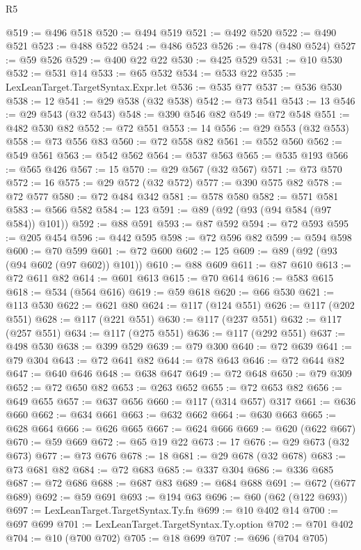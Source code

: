 \begin{lexlean}{R5}
\begin{coremodule}
@519 := @496 @518
@520 := @494 @519
@521 := @492 @520
@522 := @490 @521
@523 := @488 @522
@524 := @486 @523
@526 := @478 (@480 @524)
@527 := @59 @526
@529 := @400 @22 @22
@530 := @425 @529
@531 := @10 @530
@532 := @531 @14
@533 := @65 @532
@534 := @533 @22
@535 := LexLeanTarget.TargetSyntax.Expr.let
@536 := @535 @77
@537 := @536 @530
@538 := 12
@541 := @29 @538 (@32 @538)
@542 := @73 @541
@543 := 13
@546 := @29 @543 (@32 @543)
@548 := @390 @546 @82
@549 := @72 @548
@551 := @482 @530 @82
@552 := @72 @551
@553 := 14
@556 := @29 @553 (@32 @553)
@558 := @73 @556 @83
@560 := @72 @558 @82
@561 := @552 @560
@562 := @549 @561
@563 := @542 @562
@564 := @537 @563
@565 := @535 @193
@566 := @565 @426
@567 := 15
@570 := @29 @567 (@32 @567)
@571 := @73 @570
@572 := 16
@575 := @29 @572 (@32 @572)
@577 := @390 @575 @82
@578 := @72 @577
@580 := @72 @484 @342
@581 := @578 @580
@582 := @571 @581
@583 := @566 @582
@584 := 123
@591 := @89 (@92 (@93 (@94 @584 (@97 @584)) @101))
@592 := @88 @591
@593 := @87 @592
@594 := @72 @593
@595 := @205 @454
@596 := @442 @595
@598 := @72 @596 @82
@599 := @594 @598
@600 := @70 @599
@601 := @72 @600
@602 := 125
@609 := @89 (@92 (@93 (@94 @602 (@97 @602)) @101))
@610 := @88 @609
@611 := @87 @610
@613 := @72 @611 @82
@614 := @601 @613
@615 := @70 @614
@616 := @583 @615
@618 := @534 (@564 @616)
@619 := @59 @618
@620 := @66 @530
@621 := @113 @530
@622 := @621 @80
@624 := @117 (@124 @551)
@626 := @117 (@202 @551)
@628 := @117 (@221 @551)
@630 := @117 (@237 @551)
@632 := @117 (@257 @551)
@634 := @117 (@275 @551)
@636 := @117 (@292 @551)
@637 := @498 @530
@638 := @399 @529
@639 := @79 @300
@640 := @72 @639
@641 := @79 @304
@643 := @72 @641 @82
@644 := @78 @643
@646 := @72 @644 @82
@647 := @640 @646
@648 := @638 @647
@649 := @72 @648
@650 := @79 @309
@652 := @72 @650 @82
@653 := @263 @652
@655 := @72 @653 @82
@656 := @649 @655
@657 := @637 @656
@660 := @117 (@314 @657) @317
@661 := @636 @660
@662 := @634 @661
@663 := @632 @662
@664 := @630 @663
@665 := @628 @664
@666 := @626 @665
@667 := @624 @666
@669 := @620 (@622 @667)
@670 := @59 @669
@672 := @65 @19 @22
@673 := 17
@676 := @29 @673 (@32 @673)
@677 := @73 @676
@678 := 18
@681 := @29 @678 (@32 @678)
@683 := @73 @681 @82
@684 := @72 @683
@685 := @337 @304
@686 := @336 @685
@687 := @72 @686
@688 := @687 @83
@689 := @684 @688
@691 := @672 (@677 @689)
@692 := @59 @691
@693 := @194 @63
@696 := @60 (@62 (@122 @693))
@697 := LexLeanTarget.TargetSyntax.Ty.fn
@699 := @10 @402 @14
@700 := @697 @699
@701 := LexLeanTarget.TargetSyntax.Ty.option
@702 := @701 @402
@704 := @10 (@700 @702)
@705 := @18 @699
@707 := @696 (@704 @705)

\end{coremodule}
\end{lexlean}
